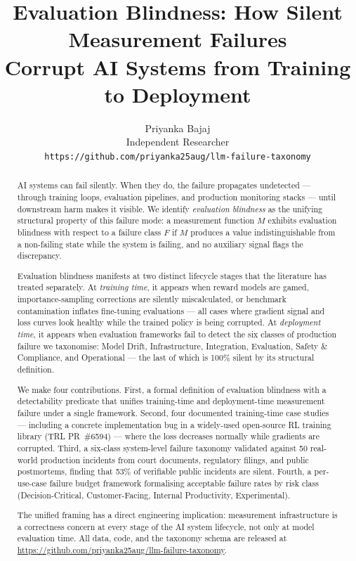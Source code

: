 \documentclass{article}
\title{Evaluation Blindness: How Silent Measurement Failures\\
       Corrupt AI Systems from Training to Deployment}
\author{%
  Priyanka Bajaj \\
  Independent Researcher \\
  \texttt{https://github.com/priyanka25aug/llm-failure-taxonomy}
}
\begin{document}
\sloppy   %

\maketitle

\begin{abstract}
AI systems can fail silently.  When they do, the failure propagates undetected
--- through training loops, evaluation pipelines, and production monitoring
stacks --- until downstream harm makes it visible.  We identify \emph{evaluation
blindness} as the unifying structural property of this failure mode: a
measurement function $M$ exhibits evaluation blindness with respect to a failure
class $F$ if $M$ produces a value indistinguishable from a non-failing state
while the system is failing, and no auxiliary signal flags the discrepancy.

Evaluation blindness manifests at two distinct lifecycle stages that the
literature has treated separately.  At \emph{training time}, it appears when
reward models are gamed, importance-sampling corrections are silently
miscalculated, or benchmark contamination inflates fine-tuning evaluations ---
all cases where gradient signal and loss curves look healthy while the trained
policy is being corrupted.  At \emph{deployment time}, it appears when
evaluation frameworks fail to detect the six classes of production failure we
taxonomise: Model Drift, Infrastructure, Integration, Evaluation, Safety \&
Compliance, and Operational --- the last of which is 100\% silent by its
structural definition.

We make four contributions.  First, a formal definition of evaluation blindness
with a detectability predicate that unifies training-time and deployment-time
measurement failure under a single framework.  Second, four documented
training-time case studies --- including a concrete implementation bug in a
widely-used open-source RL training library (TRL PR~\#6594) --- where the loss
decreases normally while gradients are corrupted.  Third, a six-class
system-level failure taxonomy validated against 50 real-world production
incidents from court documents, regulatory filings, and public postmortems,
finding that 53\% of verifiable public incidents are silent.  Fourth, a per-use-case failure
budget framework formalising acceptable failure rates by risk class
(Decision-Critical, Customer-Facing, Internal Productivity, Experimental).

The unified framing has a direct engineering implication: measurement
infrastructure is a correctness concern at every stage of the AI system
lifecycle, not only at model evaluation time.  All data, code, and the taxonomy
schema are released at \url{https://github.com/priyanka25aug/llm-failure-taxonomy}.
\end{abstract}
\end{document}
